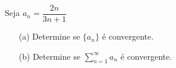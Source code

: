 \item\label{5}
Seja $a_n = \dfrac{2n}{3n + 1}$

\begin{enumerate}
    \item[(a)] Determine se $\{ a_n \}$ é convergente.
    \item[(b)] Determine se $\sum_{n=1}^{\infty} a_n $ é convergente.
\end{enumerate}
